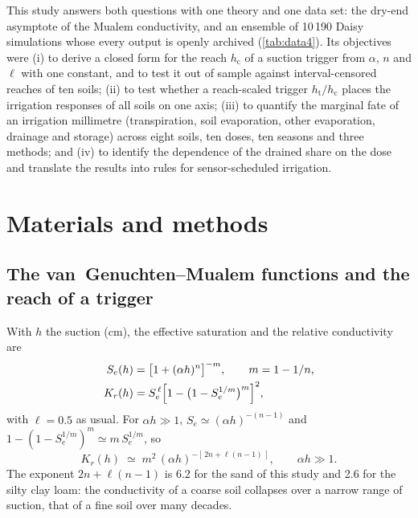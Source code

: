 \documentclass[review,12pt,authoryear]{elsarticle}
\newcommand{\hc}{h_{\mathrm{c}}}
\newcommand{\htr}{h_{\mathrm{t}}}
\begin{document}
This study answers both questions with one theory and one data set: the dry-end asymptote of the Mualem conductivity, and an ensemble of 10\,190 Daisy simulations \citep{Hansen2012,Holbak2026} whose every output is openly archived (\cref{tab:data4}). Its objectives were (i) to derive a closed form for the reach $\hc$ of a suction trigger from $\alpha$, $n$ and $\ell$ with one constant, and to test it out of sample against interval-censored reaches of ten soils; (ii) to test whether a reach-scaled trigger $\htr/\hc$ places the irrigation responses of all soils on one axis; (iii) to quantify the marginal fate of an irrigation millimetre (transpiration, soil evaporation, other evaporation, drainage and storage) across eight soils, ten doses, ten seasons and three methods; and (iv) to identify the dependence of the drained share on the dose and translate the results into rules for sensor-scheduled irrigation.


\section{Materials and methods}
\subsection{The van~Genuchten--Mualem functions and the reach of a trigger}
With $h$ the suction (cm), the effective saturation and the relative conductivity are \citep{vanGenuchten1980,Mualem1976}
\begin{align}
S_e(h) &= \bigl[1+(\alpha h)^{n}\bigr]^{-m},\qquad m=1-1/n, \label{eq:vg}\\
K_r(h) &= S_e^{\,\ell}\Bigl[1-\bigl(1-S_e^{1/m}\bigr)^{m}\Bigr]^{2}, \label{eq:kr}
\end{align}
with $\ell=0.5$ as usual. For $\alpha h\gg1$, $S_e\simeq(\alpha h)^{-(n-1)}$ and $1-(1-S_e^{1/m})^{m}\simeq m\,S_e^{1/m}$, so
\begin{equation}
K_r(h)\;\simeq\;m^{2}\,(\alpha h)^{-[\,2n+\ell(n-1)\,]}, \qquad \alpha h\gg1.
\label{eq:asym}
\end{equation}
The exponent $2n+\ell(n-1)$ is 6.2 for the sand of this study and 2.6 for the silty clay loam: the conductivity of a coarse soil collapses over a narrow range of suction, that of a fine soil over many decades.
\end{document}
